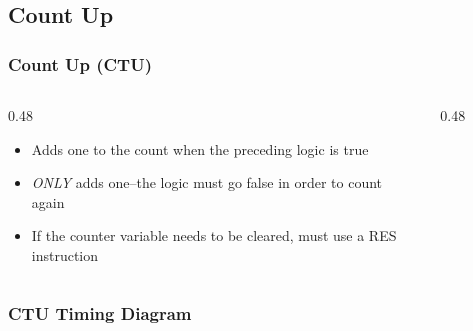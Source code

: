\subsection{Count Up}

\begin{frame}
    \frametitle{Count Up (CTU)}

    \begin{columns}
        \begin{column}{0.48\linewidth}
            \begin{itemize}
                \item Adds one to the count when the preceding logic is true
                \item \emph{ONLY} adds one--the logic must go false in order to count again
                \item If the counter variable needs to be cleared, must use a RES instruction
            \end{itemize}
        \end{column}
        \begin{column}{0.48\linewidth}
            \begin{figure}
                \centering
                
            \end{figure}
        \end{column}
    \end{columns}
\end{frame}

\begin{frame}
    \frametitle{CTU Timing Diagram}

    \centering
    \resizebox{0.875\linewidth}{!}{
        
    }
\end{frame}

